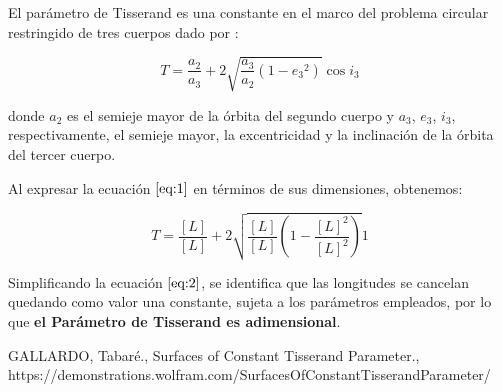 \documentclass[11pt,letterpaper]{article}
\begin{document}
El parámetro de Tisserand es una constante en el marco del problema circular restringido de tres cuerpos dado por \cite{WF}:

\begin{equation}\label{eq:1}
T = \frac{a_{2}}{a_{3}}+2\sqrt{\frac{a_{3}}{a_{2}}(1-{e_{3}}^2)}\cos{i_{3}}
\end{equation}

donde $a_{2}$ es el semieje mayor de la órbita del segundo cuerpo y $a_{3}$, $e_{3}$, $i_{3}$, respectivamente, el semieje mayor, la excentricidad y la inclinación de la órbita del tercer cuerpo.

Al expresar la ecuación $\ref{eq:1}$ en términos de sus dimensiones, obtenemos:

\begin{equation}\label{eq:2}
T = \frac{[L]}{[L]}+2\sqrt{\frac{[L]}{[L]}(1-{\frac{[L]^2}{[L]^2}})}1
\end{equation}

Simplificando la ecuación $\ref{eq:2}$, se identifica que las longitudes se cancelan quedando como valor una constante, sujeta a los parámetros empleados, por lo que \textbf{el Parámetro de Tisserand es adimensional}.


\begin{thebibliography}{1}
  GALLARDO, Tabaré., Surfaces of Constant Tisserand Parameter., https://demonstrations.wolfram.com/SurfacesOfConstantTisserandParameter/
\end{thebibliography}
\end{document}
